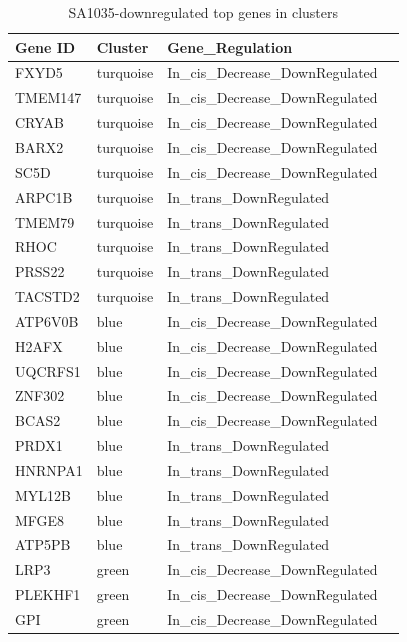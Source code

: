 
 \begin{table}[htbp]
   \centering
   \caption{SA1035-downregulated top genes in clusters}
     \begin{tabular}{|l|l|l|r}
     \hline
     Gene ID & Cluster & Gene\_Regulation   \\
     \hline
     FXYD5 & turquoise & In\_cis\_Decrease\_DownRegulated  \\
     TMEM147 & turquoise & In\_cis\_Decrease\_DownRegulated  \\
     CRYAB & turquoise & In\_cis\_Decrease\_DownRegulated  \\
     BARX2 & turquoise & In\_cis\_Decrease\_DownRegulated   \\
     SC5D & turquoise & In\_cis\_Decrease\_DownRegulated   \\
     ARPC1B & turquoise & In\_trans\_DownRegulated   \\
     TMEM79 & turquoise & In\_trans\_DownRegulated   \\
     RHOC & turquoise & In\_trans\_DownRegulated   \\
     PRSS22 & turquoise & In\_trans\_DownRegulated   \\
     TACSTD2 & turquoise & In\_trans\_DownRegulated   \\
     ATP6V0B & blue & In\_cis\_Decrease\_DownRegulated   \\
     H2AFX & blue & In\_cis\_Decrease\_DownRegulated  \\
     UQCRFS1 & blue & In\_cis\_Decrease\_DownRegulated  \\
     ZNF302 & blue & In\_cis\_Decrease\_DownRegulated   \\
     BCAS2 & blue & In\_cis\_Decrease\_DownRegulated   \\
     PRDX1 & blue & In\_trans\_DownRegulated   \\
     HNRNPA1 & blue & In\_trans\_DownRegulated   \\
     MYL12B & blue & In\_trans\_DownRegulated   \\
     MFGE8 & blue & In\_trans\_DownRegulated   \\
     ATP5PB & blue & In\_trans\_DownRegulated   \\
     LRP3 & green & In\_cis\_Decrease\_DownRegulated   \\
     PLEKHF1 & green & In\_cis\_Decrease\_DownRegulated   \\
     GPI & green & In\_cis\_Decrease\_DownRegulated  \\

\end{tabular}
\end{table}
